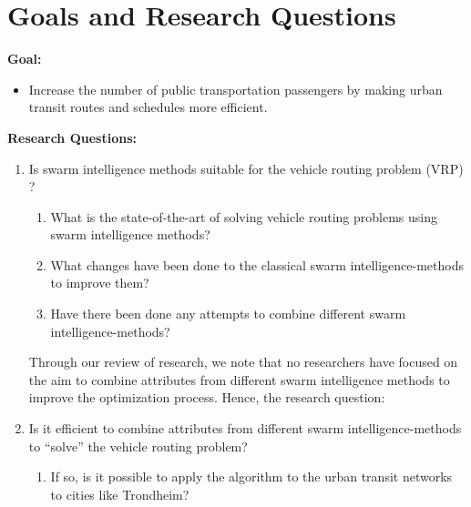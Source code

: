 \section{Goals and Research Questions}
\textbf{Goal:}
\begin{itemize}
\item Increase the number of public transportation passengers by making urban transit routes and schedules more efficient.
\end{itemize}
\textbf{Research Questions:}
\begin{enumerate}
  \item Is swarm intelligence methods suitable for the vehicle routing problem (VRP) ?
    \begin{enumerate}
    \item What is the state-of-the-art of solving vehicle routing problems using swarm intelligence methods?
    \item What changes have been done to the classical swarm intelligence-methods to improve them?
    \item Have there been done any attempts to combine different swarm intelligence-methods?
  \end{enumerate}

Through our review of research, we note that no researchers have focused on the aim to combine attributes from different swarm intelligence methods to improve the optimization process. Hence, the research question:

\item Is it efficient to combine attributes from different swarm intelligence-methods to ``solve'' the vehicle routing problem?
    \begin{enumerate}
    \item If so, is it possible to apply the algorithm to the urban transit networks to cities like Trondheim?
  \end{enumerate}
\end{enumerate}